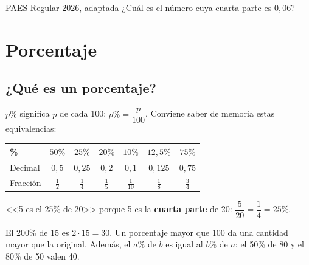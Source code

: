 \begin{elejemplo}{PAES Regular 2026, adaptada}
¿Cuál es el número cuya cuarta parte es $0{,}06$?
\end{elejemplo}

\section{Porcentaje}

\subsection{¿Qué es un porcentaje?}
$p\%$ significa $p$ de cada 100: $p\% = \dfrac{p}{100}$. Conviene saber de memoria estas equivalencias:
\begin{center}
\begin{tabular}{lcccccc}
\toprule \% & $50\%$ & $25\%$ & $20\%$ & $10\%$ & $12{,}5\%$ & $75\%$\\ \midrule
Decimal & $0{,}5$ & $0{,}25$ & $0{,}2$ & $0{,}1$ & $0{,}125$ & $0{,}75$\\
Fracción & $\tfrac{1}{2}$ & $\tfrac{1}{4}$ & $\tfrac{1}{5}$ & $\tfrac{1}{10}$ & $\tfrac{1}{8}$ & $\tfrac{3}{4}$\\ \bottomrule
\end{tabular}
\end{center}
\begin{ejemplo} <<5 es el 25\% de 20>> porque 5 es la \textbf{cuarta parte} de 20: $\dfrac{5}{20} = \dfrac{1}{4} = 25\%$.\end{ejemplo}
\begin{ojo}[Más de 100\%] El 200\% de 15 es $2\cdot 15 = 30$. Un porcentaje mayor que 100 da una cantidad mayor que la original. Además, el $a\%$ de $b$ es igual al $b\%$ de $a$: el 50\% de 80 y el 80\% de 50 valen 40.\end{ojo}

